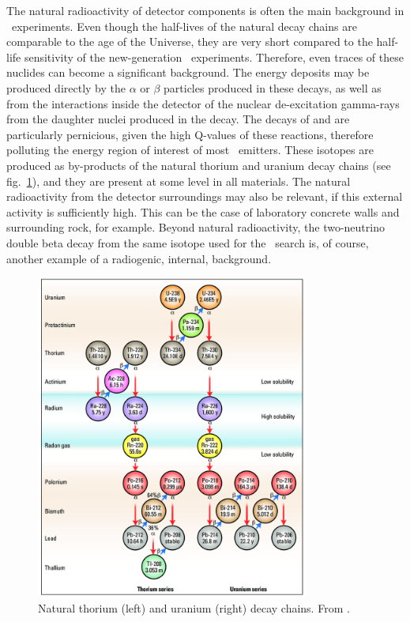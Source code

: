 The natural radioactivity of detector components is often the main background in \bbonu\ experiments. Even though the half-lives of the natural decay chains are comparable to the age of the Universe, they are very short compared to the half-life sensitivity of the new-generation \bbonu\ experiments. Therefore, even traces of these nuclides can become a significant background. The energy deposits may be produced directly by the $\alpha$ or $\beta$ particles produced in these decays, as well as from the interactions inside the detector of the nuclear de-excitation gamma-rays from the daughter nuclei produced in the decay. The decays of  and  are particularly pernicious, given the high Q-values of these reactions, therefore polluting the energy region of interest of most \bb\ emitters. These isotopes are produced as by-products of the natural thorium and uranium decay chains (see fig.~\ref{fig:decaychain}), and they are present at some level in all materials. The natural radioactivity from the detector surroundings may also be relevant, if this external activity is sufficiently high. This can be the case of laboratory concrete walls and surrounding rock, for example. Beyond natural radioactivity, the two-neutrino double beta decay from the same isotope used for the \bbonu\ search is, of course, another example of a radiogenic, internal, background. 

\begin{figure}[t!b!]
\begin{center}
\includegraphics[width=0.8\textwidth]{img/Natural-thorium-and-uranium-decay-chains.png} 
\caption{Natural thorium (left) and uranium (right) decay chains. From \cite{decaychain}.} \label{fig:decaychain}
\end{center}
\end{figure}

